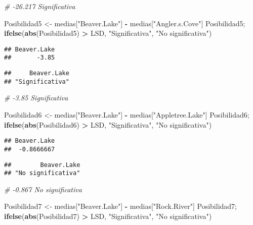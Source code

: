 \documentclass[
]{article}
\newenvironment{Shaded}{\begin{snugshade}}{\end{snugshade}}
\newcommand{\CommentTok}[1]{\textcolor[rgb]{0.56,0.35,0.01}{\textit{#1}}}
\newcommand{\FunctionTok}[1]{\textcolor[rgb]{0.13,0.29,0.53}{\textbf{#1}}}
\newcommand{\NormalTok}[1]{#1}
\newcommand{\OtherTok}[1]{\textcolor[rgb]{0.56,0.35,0.01}{#1}}
\newcommand{\SpecialCharTok}[1]{\textcolor[rgb]{0.81,0.36,0.00}{\textbf{#1}}}
\newcommand{\StringTok}[1]{\textcolor[rgb]{0.31,0.60,0.02}{#1}}
\begin{document}
\begin{Shaded}
\begin{Highlighting}[]
\CommentTok{\# {-}26.217 Significativa}

\NormalTok{Posibilidad5 }\OtherTok{\textless{}{-}}\NormalTok{ medias[}\StringTok{"Beaver.Lake"}\NormalTok{] }\SpecialCharTok{{-}}\NormalTok{ medias[}\StringTok{"Angler.s.Cove"}\NormalTok{]}
\NormalTok{Posibilidad5; }\FunctionTok{ifelse}\NormalTok{(}\FunctionTok{abs}\NormalTok{(Posibilidad5) }\SpecialCharTok{\textgreater{}}\NormalTok{ LSD, }\StringTok{"Significativa"}\NormalTok{, }\StringTok{"No significativa"}\NormalTok{)}
\end{Highlighting}
\end{Shaded}

\begin{verbatim}
## Beaver.Lake 
##       -3.85
\end{verbatim}

\begin{verbatim}
##     Beaver.Lake 
## "Significativa"
\end{verbatim}

\begin{Shaded}
\begin{Highlighting}[]
\CommentTok{\# {-}3.85 Significativa}

\NormalTok{Posibilidad6 }\OtherTok{\textless{}{-}}\NormalTok{ medias[}\StringTok{"Beaver.Lake"}\NormalTok{] }\SpecialCharTok{{-}}\NormalTok{ medias[}\StringTok{"Appletree.Lake"}\NormalTok{]}
\NormalTok{Posibilidad6; }\FunctionTok{ifelse}\NormalTok{(}\FunctionTok{abs}\NormalTok{(Posibilidad6) }\SpecialCharTok{\textgreater{}}\NormalTok{ LSD, }\StringTok{"Significativa"}\NormalTok{, }\StringTok{"No significativa"}\NormalTok{)}
\end{Highlighting}
\end{Shaded}

\begin{verbatim}
## Beaver.Lake 
##  -0.8666667
\end{verbatim}

\begin{verbatim}
##        Beaver.Lake 
## "No significativa"
\end{verbatim}

\begin{Shaded}
\begin{Highlighting}[]
\CommentTok{\# {-}0.867 No significativa}

\NormalTok{Posibilidad7 }\OtherTok{\textless{}{-}}\NormalTok{ medias[}\StringTok{"Beaver.Lake"}\NormalTok{] }\SpecialCharTok{{-}}\NormalTok{ medias[}\StringTok{"Rock.River"}\NormalTok{]}
\NormalTok{Posibilidad7; }\FunctionTok{ifelse}\NormalTok{(}\FunctionTok{abs}\NormalTok{(Posibilidad7) }\SpecialCharTok{\textgreater{}}\NormalTok{ LSD, }\StringTok{"Significativa"}\NormalTok{, }\StringTok{"No significativa"}\NormalTok{)}
\end{Highlighting}
\end{Shaded}
\end{document}
